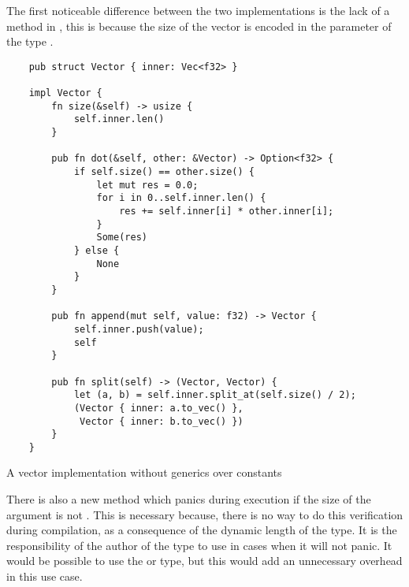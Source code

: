 The first noticeable difference between the two implementations is the lack of
a  method in , this is because the size
of the vector is encoded in the  parameter of the type
. 

\begin{listing}[H]
    \begin{verbatim}
    pub struct Vector { inner: Vec<f32> }

    impl Vector {
        fn size(&self) -> usize {
            self.inner.len()
        }

        pub fn dot(&self, other: &Vector) -> Option<f32> {
            if self.size() == other.size() {
                let mut res = 0.0; 
                for i in 0..self.inner.len() {
                    res += self.inner[i] * other.inner[i];
                }
                Some(res)
            } else {
                None
            }
        }

        pub fn append(mut self, value: f32) -> Vector {
            self.inner.push(value);
            self
        }

        pub fn split(self) -> (Vector, Vector) {
            let (a, b) = self.inner.split_at(self.size() / 2);
            (Vector { inner: a.to_vec() }, 
             Vector { inner: b.to_vec() })
        }
    }
    \end{verbatim}
    \caption{A vector implementation without generics over constants}
  \label{lst:vector_vanilla}
\end{listing}

There is also a new method  which panics during
execution if the size of the  argument is not .  This is
necessary because, there is no way to do this verification during compilation,
as a consequence of the dynamic length of the  type. It is the
responsibility of the author of the  type to use
 in cases when it will not panic. It would be
possible to use the  or  type, but this would add
an unnecessary overhead in this use case.

